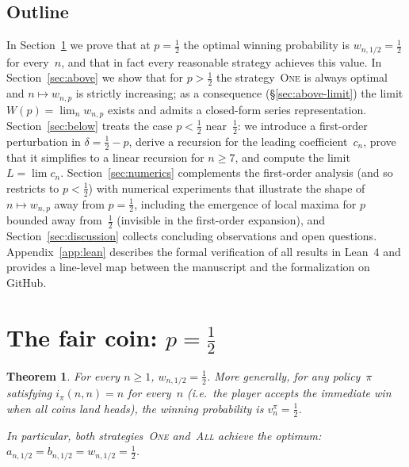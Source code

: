 \documentclass[reqno,final,11pt]{amsart}
\theoremstyle{plain}
\newtheorem{theorem}{Theorem}[section]
\theoremstyle{definition}
\theoremstyle{remark}
\newcommand{\One}{\textsc{One}}
\newcommand{\All}{\textsc{All}}
\begin{document}
\subsection{Outline}

In Section~\ref{sec:fair} we prove that at $p=\tfrac12$ the optimal
winning probability is $w_{n,1/2}=\tfrac12$ for every~$n$, and that
in fact every reasonable strategy achieves this value.  In
Section~\ref{sec:above} we show that for $p>\tfrac12$ the
strategy~\One{} is always optimal and $n\mapsto w_{n,p}$ is strictly
increasing; as a consequence (\S\ref{sec:above-limit}) the limit
$W(p)=\lim_n w_{n,p}$ exists and admits a closed-form series
representation.  Section~\ref{sec:below} treats the case
$p<\tfrac12$ near~$\tfrac12$: we introduce a first-order
perturbation in $\delta=\tfrac12-p$, derive a recursion for the
leading coefficient~$c_n$, prove that it simplifies to a linear
recursion for $n\ge 7$, and compute the limit $L=\lim c_n$.
Section~\ref{sec:numerics} complements the first-order analysis
(and so restricts to $p<\tfrac12$) with numerical experiments that
illustrate the shape of $n\mapsto w_{n,p}$ away from $p=\tfrac12$,
including the emergence of local maxima for $p$ bounded away
from~$\tfrac12$ (invisible in the first-order expansion), and
Section~\ref{sec:discussion}
collects concluding observations and open questions.
Appendix~\ref{app:lean}
describes the formal verification of all results in Lean~4 and
provides a line-level map between the manuscript and the
formalization on GitHub.

\section{The fair coin: \texorpdfstring{$p=\tfrac12$}{p = 1/2}}
\label{sec:fair}

\begin{theorem}\label{thm:half}
  For every $n\ge 1$, $w_{n,1/2}=\tfrac12$.  More generally, for any
  policy~$\pi$ satisfying $i_\pi(n,n)=n$ for every~$n$ (i.e.\ the
  player accepts the immediate win when all coins land heads), the
  winning probability is $v_n^\pi=\tfrac12$.

  In particular, both strategies~\One{} and~\All{} achieve the
  optimum: $a_{n,1/2}=b_{n,1/2}=w_{n,1/2}=\tfrac12$.
\end{theorem}
\end{document}
